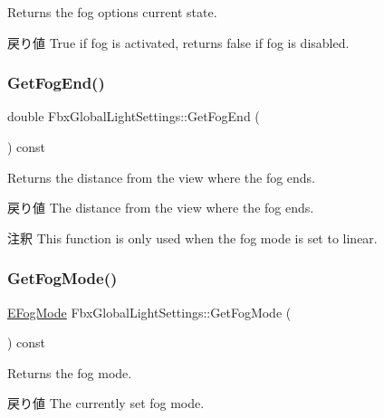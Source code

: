 Returns the fog option\textquotesingle{}s current state. \begin{DoxyReturn}{戻り値}
{\ttfamily True} if fog is activated, returns {\ttfamily false} if fog is disabled. 
\end{DoxyReturn}
\mbox{\label{class_fbx_global_light_settings_a04ed07f18330b888bd4439038e3dad2a}} 
\subsubsection{\texorpdfstring{Get\+Fog\+End()}{GetFogEnd()}}
{\footnotesize\ttfamily double Fbx\+Global\+Light\+Settings\+::\+Get\+Fog\+End (\begin{DoxyParamCaption}{ }\end{DoxyParamCaption}) const}

Returns the distance from the view where the fog ends. \begin{DoxyReturn}{戻り値}
The distance from the view where the fog ends. 
\end{DoxyReturn}
\begin{DoxyRemark}{注釈}
This function is only used when the fog mode is set to linear. 
\end{DoxyRemark}
\mbox{\label{class_fbx_global_light_settings_a29f90b9f3f5c1a9057cf226c80892df1}} 
\subsubsection{\texorpdfstring{Get\+Fog\+Mode()}{GetFogMode()}}
{\footnotesize\ttfamily \hyperlink{class_fbx_global_light_settings_a2d6040cb267cbdb092bdf9fb73de8d6d}{E\+Fog\+Mode} Fbx\+Global\+Light\+Settings\+::\+Get\+Fog\+Mode (\begin{DoxyParamCaption}{ }\end{DoxyParamCaption}) const}

Returns the fog mode. \begin{DoxyReturn}{戻り値}
The currently set fog mode. 
\end{DoxyReturn}
\mbox{\label{class_fbx_global_light_settings_a36162af4c56d06d37ce07ebd7a4d52a6}} 
